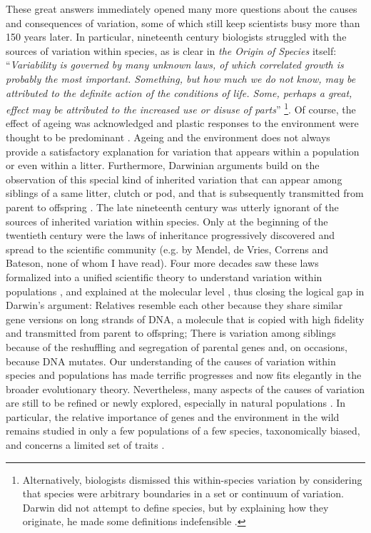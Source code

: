 These great answers immediately opened many more questions about the causes and consequences of variation, some of which still keep scientists busy more than 150 years later. In particular, nineteenth century biologists struggled with the sources of variation within species, as is clear in \emph{the Origin of Species} itself:  ``\emph{Variability is governed by many unknown laws, of which correlated growth is probably the most important. Something, but how much we do not know, may be attributed to the definite action of the conditions of life. Some, perhaps a great, effect may be attributed to the increased use or disuse of parts}'' \parencite[p. 31][]{Darwin1859} \footnote{Alternatively, biologists dismissed this within-species variation by considering that species were arbitrary boundaries in a set or continuum of variation. Darwin did not attempt to define species, but by explaining how they originate, he made some definitions indefensible \parencite[][pp. 129-163]{Wilkins2009}.}. Of course, the effect of ageing was acknowledged and plastic responses to the environment were thought to be predominant \parencite{Wilkins2009}. Ageing and the environment does not always provide a satisfactory explanation for variation that appears within a population or even within a litter.
Furthermore, Darwinian arguments build on the observation of this special kind of inherited variation that can appear among siblings of a same litter, clutch or pod, and that is subsequently transmitted from parent to offspring \parencite[][Chapter 1]{Darwin1859}. The late nineteenth century was utterly ignorant of the sources of inherited variation within species. Only at the beginning of the twentieth century were the laws of inheritance progressively discovered and spread to the scientific community (e.g. by Mendel, de Vries, Correns and Bateson, none of whom I have read). Four more decades saw these laws formalized into a unified scientific theory to understand variation within populations \parencite{Fisher1930}, and explained at the molecular level \parencite{Oswald1943, Watson1953}, thus closing the logical gap in Darwin's argument: Relatives resemble each other because they share similar gene versions on long strands of DNA, a molecule that is copied with high fidelity and transmitted from parent to offspring; There is variation among siblings because of the reshuffling and segregation of parental genes and, on occasions, because DNA mutates. 
Our understanding of the causes of variation within species and populations has made terrific progresses and now fits elegantly in the broader evolutionary theory. Nevertheless, many aspects of the causes of variation are still to be refined or newly explored, especially in natural populations \parencite{Kruuk2014}. In particular, the relative importance of genes and the environment in the wild remains studied in only a few populations of a few species, taxonomically biased, and concerns a limited set of traits \parencite{Postma2014}. 

